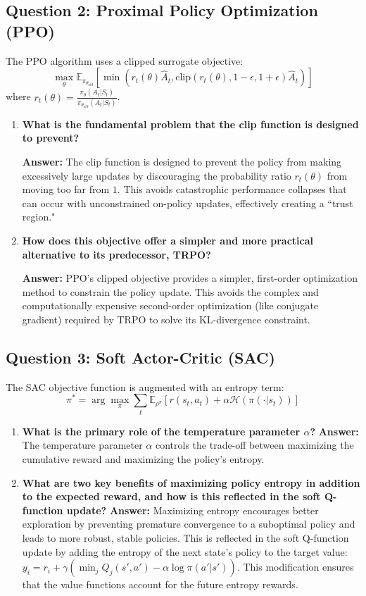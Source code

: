 \documentclass[12pt]{article}
\begin{document}
\subsection*{Question 2: Proximal Policy Optimization (PPO)}
The PPO algorithm uses a clipped surrogate objective:
$$ \max_\theta \mathbb{E}_{\pi_{\theta_{old}}} \left[ \min\left( r_t(\theta) \hat{A}_t, \text{clip}(r_t(\theta), 1 - \epsilon, 1 + \epsilon) \hat{A}_t \right) \right] $$
where $r_t(\theta) = \frac{\pi_\theta(A_t|S_t)}{\pi_{\theta_{old}}(A_t|S_t)}$.
\begin{enumerate}
    \item \textbf{What is the fundamental problem that the clip function is designed to prevent?}
    
    \textbf{Answer:} The clip function is designed to prevent the policy from making excessively large updates by discouraging the probability ratio $r_t(\theta)$ from moving too far from $1$. This avoids catastrophic performance collapses that can occur with unconstrained on-policy updates, effectively creating a ``trust region."
    \item \textbf{How does this objective offer a simpler and more practical alternative to its predecessor, TRPO?}

    \textbf{Answer:} PPO's clipped objective provides a simpler, first-order optimization method to constrain the policy update. This avoids the complex and computationally expensive second-order optimization (like conjugate gradient) required by TRPO to solve its KL-divergence constraint.
\end{enumerate}

\subsection*{Question 3: Soft Actor-Critic (SAC)}
The SAC objective function is augmented with an entropy term:
$$ \pi^* = \arg\max_\pi \sum_t \mathbb{E}_{\rho^\pi} [r(s_t, a_t) + \alpha \mathcal{H}(\pi(\cdot|s_t))] $$
\begin{enumerate}
    \item \textbf{What is the primary role of the temperature parameter $\alpha$?}
    \textbf{Answer:} The temperature parameter $\alpha$ controls the trade-off between maximizing the cumulative reward and maximizing the policy's entropy.
    \item \textbf{What are two key benefits of maximizing policy entropy in addition to the expected reward, and how is this reflected in the soft Q-function update?}
    \textbf{Answer:} Maximizing entropy encourages better exploration by preventing premature convergence to a suboptimal policy and leads to more robust, stable policies. This is reflected in the soft Q-function update by adding the entropy of the next state's policy to the target value: $y_i = r_i + \gamma(\min_j Q_j(s', a') - \alpha \log\pi(a'|s'))$. This modification ensures that the value functions account for the future entropy rewards.
\end{enumerate}
\end{document}
